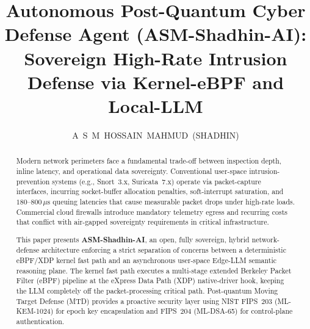 \documentclass[journal]{IEEEtran}
\renewcommand{\_}{\textunderscore\allowbreak}
\begin{document}
\title{Autonomous Post-Quantum Cyber Defense Agent (ASM-Shadhin-AI):
  Sovereign High-Rate Intrusion Defense via Kernel-eBPF and Local-LLM}

\author{\uppercase{A~S~M~Hossain~Mahmud~(Shadhin)}}

\maketitle
\thispagestyle{fancy}

\begin{abstract}
Modern network perimeters face a fundamental trade-off between inspection
depth, inline latency, and operational data sovereignty. Conventional
user-space intrusion-prevention systems (e.g., Snort~3.x, Suricata~7.x)
operate via packet-capture interfaces, incurring socket-buffer allocation
penalties, soft-interrupt saturation, and $180$--$800\,\mu\text{s}$
queuing latencies that cause measurable packet drops under high-rate loads.
Commercial cloud firewalls introduce mandatory telemetry egress and
recurring costs that conflict with air-gapped sovereignty requirements in
critical infrastructure.

This paper presents \textbf{ASM-Shadhin-AI}, an open, fully sovereign,
hybrid network-defense architecture enforcing a strict separation of concerns
between a deterministic eBPF/XDP kernel fast path and an asynchronous
user-space Edge-LLM semantic reasoning plane. The kernel fast path executes
a multi-stage extended Berkeley Packet Filter (eBPF) pipeline at the eXpress
Data Path (XDP) native-driver hook, keeping the LLM completely off the
packet-processing critical path. Post-quantum Moving Target Defense (MTD)
provides a proactive security layer using NIST FIPS~203 (ML-KEM-1024) for
epoch key encapsulation and FIPS~204 (ML-DSA-65) for control-plane
authentication.


\end{abstract}
\end{document}

